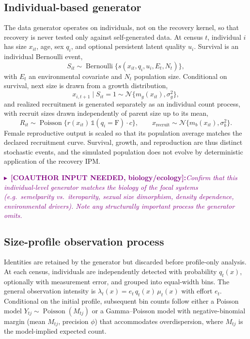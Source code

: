 \documentclass[11pt]{article}
\newcommand{\Normal}{\mathcal{N}}
\newcommand{\needbio}[1]{%
  \par\smallskip\noindent%
  \textcolor{purple}{$\blacktriangleright$~\textbf{[COAUTHOR INPUT NEEDED, biology/ecology]:}\space\textit{#1}}%
  \par\smallskip}
\begin{document}
\subsection{Individual-based generator}
The data generator operates on individuals, not on the recovery kernel, so that
recovery is never tested only against self-generated data. At census $t$,
individual $i$ has size $x_{it}$, age, sex $q_i$, and optional persistent latent
quality $u_i$. Survival is an individual Bernoulli event,
\begin{equation}
  S_{it}\sim\operatorname{Bernoulli}\{s(x_{it},q_i,u_i,E_t,N_t)\},
\end{equation}
with $E_t$ an environmental covariate and $N_t$ population size. Conditional on
survival, next size is drawn from a growth distribution,
\begin{equation}
  x_{i,t+1}\mid S_{it}=1 \sim \Normal\{m_g(x_{it}),\sigma_g^2\},
\end{equation}
and realized recruitment is generated separately as an individual count process,
with recruit sizes drawn independently of parent size up to its mean,
\begin{equation}
  R_{it}\sim\operatorname{Poisson}\{r(x_{it})\,\mathbb{1}(q_i=\mathrm{F})\cdot c\},
  \qquad
  x_{\mathrm{recruit}}\sim\Normal\{m_b(x_{it}),\sigma_b^2\}.
\end{equation}
Female reproductive output is scaled so that its population average matches the
declared recruitment curve. Survival, growth, and reproduction are thus distinct
stochastic events, and the simulated population does not evolve by deterministic
application of the recovery IPM.

\needbio{Confirm that this individual-level generator matches the biology of the
focal systems (e.g.\ semelparity vs.\ iteroparity, sexual size dimorphism,
density dependence, environmental drivers). Note any structurally important
process the generator omits.}

\subsection{Size-profile observation process}
Identities are retained by the generator but discarded before profile-only
analysis. At each census, individuals are independently detected with
probability $q_t(x)$, optionally with measurement error, and grouped into
equal-width bins. The general observation intensity is
$\lambda_t(x)=e_t\,q_t(x)\,\mu_t(x)$ with effort $e_t$. Conditional on the
initial profile, subsequent bin counts follow either a Poisson model
$Y_{tj}\sim\operatorname{Poisson}(M_{tj})$ or a Gamma--Poisson model with
negative-binomial margin (mean $M_{tj}$, precision $\phi$) that accommodates
overdispersion, where $M_{tj}$ is the model-implied expected count.
\end{document}
